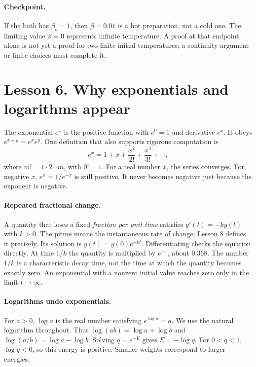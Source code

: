 \documentclass[11pt]{article}
\begin{document}
\paragraph{Checkpoint.}
If the bath has $\beta_b=1$, then $\beta=0.01$ is a hot preparation, not a cold
one. The limiting value $\beta=0$ represents infinite temperature. A proof at
that endpoint alone is not yet a proof for two finite initial temperatures;
a continuity argument or finite choices must complete it.

\clearpage
\section*{Lesson 6. Why exponentials and logarithms appear}
The exponential $e^x$ is the positive function with $e^0=1$ and derivative
$e^x$. It obeys $e^{x+y}=e^xe^y$. One definition that also supports rigorous
computation is
\[
e^x=1+x+\frac{x^2}{2!}+\frac{x^3}{3!}+\cdots,
\]
where $m!=1\cdot2\cdots m$, with $0!=1$. For a real number $x$, the series
converges. For negative $x$, $e^x=1/e^{-x}$ is still positive. It never becomes
negative just because the exponent is negative.

\paragraph{Repeated fractional change.}
A quantity that loses a fixed \emph{fraction per unit time} satisfies
$y'(t)=-k y(t)$ with $k>0$. The prime means the instantaneous rate of change; Lesson 8 defines it
precisely. Its solution is $y(t)=y(0)e^{-kt}$. Differentiating
checks the equation directly. At time $1/k$ the quantity is multiplied by
$e^{-1}$, about $0.368$. The number $1/k$ is a characteristic decay time, not
the time at which the quantity becomes exactly zero. An exponential with a
nonzero initial value reaches zero only in the limit $t\to\infty$.

\paragraph{Logarithms undo exponentials.}
For $a>0$, $\log a$ is the real number satisfying $e^{\log a}=a$.
We use the natural logarithm throughout. Thus $\log(ab)=\log a+\log b$ and
$\log(a/b)=\log a-\log b$. Solving $q=e^{-E}$ gives $E=-\log q$.
For $0<q<1$, $\log q<0$, so this energy is positive. Smaller weights correspond
to larger energies.
\end{document}
